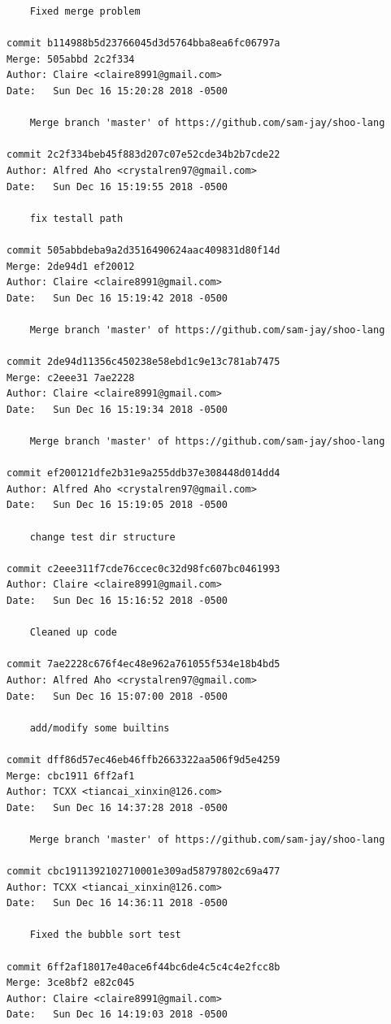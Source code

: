 \documentclass[12pt]{article}
\begin{document}
\begin{lstlisting}
    Fixed merge problem

commit b114988b5d23766045d3d5764bba8ea6fc06797a
Merge: 505abbd 2c2f334
Author: Claire <claire8991@gmail.com>
Date:   Sun Dec 16 15:20:28 2018 -0500

    Merge branch 'master' of https://github.com/sam-jay/shoo-lang

commit 2c2f334beb45f883d207c07e52cde34b2b7cde22
Author: Alfred Aho <crystalren97@gmail.com>
Date:   Sun Dec 16 15:19:55 2018 -0500

    fix testall path

commit 505abbdeba9a2d3516490624aac409831d80f14d
Merge: 2de94d1 ef20012
Author: Claire <claire8991@gmail.com>
Date:   Sun Dec 16 15:19:42 2018 -0500

    Merge branch 'master' of https://github.com/sam-jay/shoo-lang

commit 2de94d11356c450238e58ebd1c9e13c781ab7475
Merge: c2eee31 7ae2228
Author: Claire <claire8991@gmail.com>
Date:   Sun Dec 16 15:19:34 2018 -0500

    Merge branch 'master' of https://github.com/sam-jay/shoo-lang

commit ef200121dfe2b31e9a255ddb37e308448d014dd4
Author: Alfred Aho <crystalren97@gmail.com>
Date:   Sun Dec 16 15:19:05 2018 -0500

    change test dir structure

commit c2eee311f7cde76ccec0c32d98fc607bc0461993
Author: Claire <claire8991@gmail.com>
Date:   Sun Dec 16 15:16:52 2018 -0500

    Cleaned up code

commit 7ae2228c676f4ec48e962a761055f534e18b4bd5
Author: Alfred Aho <crystalren97@gmail.com>
Date:   Sun Dec 16 15:07:00 2018 -0500

    add/modify some builtins

commit dff86d57ec46eb46ffb2663322aa506f9d5e4259
Merge: cbc1911 6ff2af1
Author: TCXX <tiancai_xinxin@126.com>
Date:   Sun Dec 16 14:37:28 2018 -0500

    Merge branch 'master' of https://github.com/sam-jay/shoo-lang

commit cbc1911392102710001e309ad58797802c69a477
Author: TCXX <tiancai_xinxin@126.com>
Date:   Sun Dec 16 14:36:11 2018 -0500

    Fixed the bubble sort test

commit 6ff2af18017e40ace6f44bc6de4c5c4c4e2fcc8b
Merge: 3ce8bf2 e82c045
Author: Claire <claire8991@gmail.com>
Date:   Sun Dec 16 14:19:03 2018 -0500


\end{lstlisting}
\end{document}
